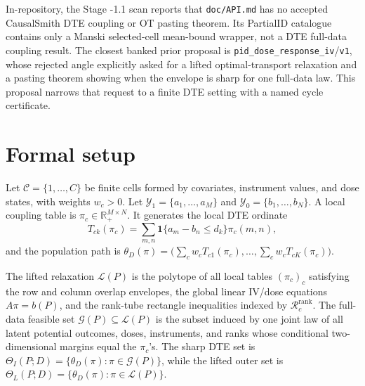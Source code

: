 \documentclass[11pt]{article}
\newcommand{\one}{\mathbf{1}}
\newcommand{\R}{\mathbb{R}}
\theoremstyle{definition}
\theoremstyle{plain}
\theoremstyle{remark}
\begin{document}
In-repository, the Stage -1.1 scan reports that \texttt{doc/API.md} has no
accepted CausalSmith DTE coupling or OT pasting theorem.  Its PartialID catalogue
contains only a Manski selected-cell mean-bound wrapper, not a DTE full-data
coupling result.  The closest banked prior proposal is
\texttt{pid\_dose\_response\_iv}/\texttt{v1}, whose rejected angle explicitly
asked for a lifted optimal-transport relaxation and a pasting theorem showing
when the envelope is sharp for one full-data law.  This proposal narrows that
request to a finite DTE setting with a named cycle certificate.

\section{Formal setup}
\label{sec:setup}
Let \(\mathcal C=\{1,\ldots,C\}\) be finite cells formed by covariates,
instrument values, and dose states, with weights \(w_c>0\).  Let
\(\mathcal Y_1=\{a_1,\ldots,a_M\}\) and
\(\mathcal Y_0=\{b_1,\ldots,b_N\}\).  A local coupling table is
\(\pi_c\in\R_+^{M\times N}\).  It generates the local DTE ordinate
\[
T_{ck}(\pi_c)=\sum_{m,n}\one\{a_m-b_n\le d_k\}\pi_c(m,n),
\]
and the population path is
\(\theta_D(\pi)=\bigl(\sum_c w_cT_{c1}(\pi_c),\ldots,\sum_cw_cT_{cK}(\pi_c)\bigr)\).

The lifted relaxation \(\mathcal L(P)\) is the polytope of all local tables
\((\pi_c)_c\) satisfying the row and column overlap envelopes, the global
linear IV/dose equations \(A\pi=b(P)\), and the rank-tube rectangle inequalities
indexed by \(\mathcal R_c^{\mathrm{rank}}\).  The full-data feasible set
\(\mathcal G(P)\subseteq\mathcal L(P)\) is the subset induced by one joint law of
all latent potential outcomes, doses, instruments, and ranks whose conditional
two-dimensional margins equal the \(\pi_c\)'s.  The sharp DTE set is
\(\Theta_I(P;D)=\{\theta_D(\pi):\pi\in\mathcal G(P)\}\), while the lifted outer
set is \(\Theta_L(P;D)=\{\theta_D(\pi):\pi\in\mathcal L(P)\}\).
\end{document}

